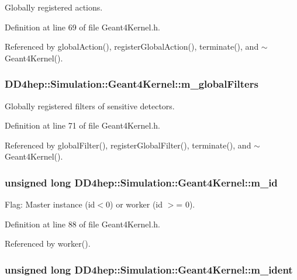 Globally registered actions. 

Definition at line 69 of file Geant4Kernel.h.

Referenced by globalAction(), registerGlobalAction(), terminate(), and $\sim$Geant4Kernel().\hypertarget{class_d_d4hep_1_1_simulation_1_1_geant4_kernel_afab7f53720ce6b7255ff54d777c4ff4e}{
\subsubsection[{m\_\-globalFilters}]{ {\bf DD4hep::Simulation::Geant4Kernel::m\_\-globalFilters}}}
\label{class_d_d4hep_1_1_simulation_1_1_geant4_kernel_afab7f53720ce6b7255ff54d777c4ff4e}


Globally registered filters of sensitive detectors. 

Definition at line 71 of file Geant4Kernel.h.

Referenced by globalFilter(), registerGlobalFilter(), terminate(), and $\sim$Geant4Kernel().\hypertarget{class_d_d4hep_1_1_simulation_1_1_geant4_kernel_ad9fa311cf783a581dc24b158b754f3bc}{
\subsubsection[{m\_\-id}]{\setlength{\rightskip}{0pt plus 5cm}unsigned long {\bf DD4hep::Simulation::Geant4Kernel::m\_\-id}}}
\label{class_d_d4hep_1_1_simulation_1_1_geant4_kernel_ad9fa311cf783a581dc24b158b754f3bc}


Flag: Master instance (id$<$0) or worker (id $>$= 0). 

Definition at line 88 of file Geant4Kernel.h.

Referenced by worker().\hypertarget{class_d_d4hep_1_1_simulation_1_1_geant4_kernel_ac7d95e62b3a0cb5180bdb3c20bd79a1d}{
\subsubsection[{m\_\-ident}]{\setlength{\rightskip}{0pt plus 5cm}unsigned long {\bf DD4hep::Simulation::Geant4Kernel::m\_\-ident}}}
\label{class_d_d4hep_1_1_simulation_1_1_geant4_kernel_ac7d95e62b3a0cb5180bdb3c20bd79a1d}


